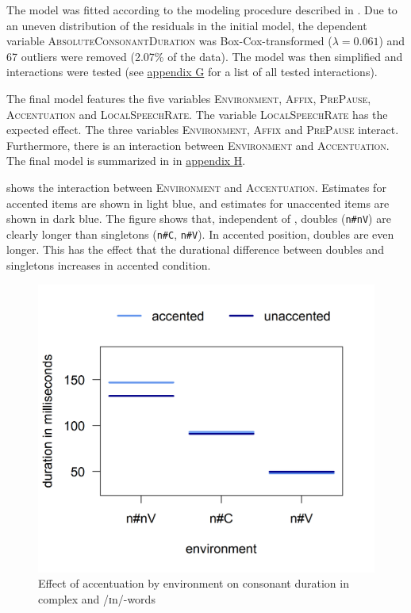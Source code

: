  The model was fitted according to the modeling procedure described in . Due to an uneven distribution of the residuals in the initial model, the dependent variable \textsc{AbsoluteConsonantDuration} was Box-Cox-transformed ($\lambda = 0.061$) and 67 outliers were removed (2.07\% of the data).
The model was then simplified and interactions were tested (see \hyperref[Appendix G Summaries of tested interactions in experimental study]{appendix G} for a list of all tested interactions).


The final model features the five variables \textsc{Environment}, \textsc{Affix}, \textsc{PrePause}, \textsc{Accentuation} and \textsc{LocalSpeechRate}. The variable \textsc{LocalSpeechRate} has the expected effect. The three variables \textsc{Environment}, \textsc{Affix} and \textsc{PrePause} interact. Furthermore, there is an interaction between \textsc{Environment} and \textsc{Accentuation}. The final model is summarized in  in \hyperref[Appendix H: Model Summaries Experiment]{appendix H}.


 shows the interaction between \textsc{Environment} and \textsc{Accentuation}. Estimates for accented items are shown in light blue, and estimates  for unaccented items are shown in dark blue. The figure shows that, independent of , doubles (\texttt{n\#nV}) are clearly longer than singletons (\texttt{n\#C}, \texttt{n\#V}). In accented position, doubles are even longer. This has the effect that the durational difference between doubles and singletons increases in accented condition.



\begin{figure}
	
	\includegraphics [scale=0.5] {images/Experiment/UnInInterEnvAcc}
	\caption{Effect of accentuation by environment on consonant duration in complex  and /ɪn/-words}
	\label{fig: Un In experiment Env and accent}
\end{figure}

